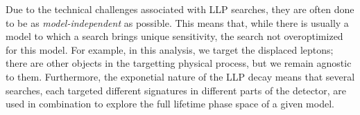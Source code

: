 Due to the technical challenges associated with \ac{LLP} searches, they are often done to be as \emph{model-independent} as possible. This means that, while there is usually a model to which a search brings unique sensitivity, the search not overoptimized for this model. For example, in this analysis, we target the displaced leptons; there are other objects in the targetting physical process, but we remain agnostic to them. Furthermore, the exponetial nature of the \ac{LLP} decay means that several searches, each targeted different signatures in different parts of the detector, are used in combination to explore the full lifetime phase space of a given model.




